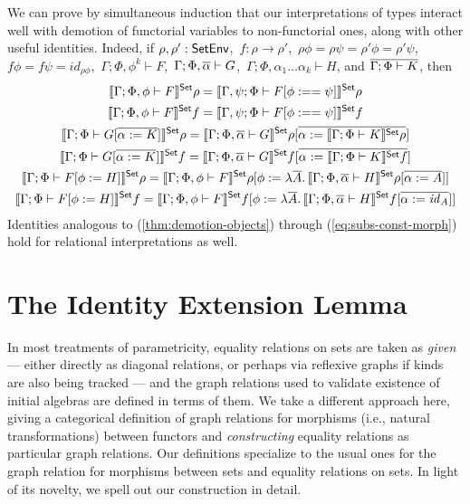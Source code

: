 \documentclass{lmcs}
\theoremstyle{plain}\newtheorem{satz}[thm]{Satz}
\renewcommand{\id}{\mathit{id}}
\begin{document}
{We can prove by simultaneous induction that our interpretations of
types interact well with demotion of functorial variables to
non-functorial ones, along with other useful identities. Indeed, if
$\rho, \rho' : \mathsf{SetEnv}$, \,$f : \rho \to \rho'$, \,$\rho \phi = \rho
\psi = \rho' \phi = \rho' \psi$, \, $f \phi = f \psi = \id_{\rho
  \phi}$,\, $\Gamma; \Phi, \phi^k \vdash F$,\,
$\Gamma;\Phi,\overline{\alpha} \vdash G$,\, $\Gamma;\Phi,\alpha_1...\alpha_k
\vdash H$, and $\overline{\Gamma;\Phi \vdash K}$, then
\begin{gather}
\label{thm:demotion-objects}
\setsem{\Gamma; \Phi, \phi \vdash F} \rho = \setsem{\Gamma, \psi; \Phi
  \vdash F[\phi :== \psi] } \rho\\
\label{thm:demotion-morphisms}
\setsem{\Gamma; \Phi, \phi \vdash F} f = \setsem{\Gamma, \psi; \Phi
  \vdash F[\phi :== \psi]} f\\
\label{eq:subs-var}
\setsem{\Gamma;\Phi \vdash G[\ol{\alpha := K}]}\rho =
\setsem{\Gamma;\Phi,\ol{\alpha} \vdash G}\rho[\ol{\alpha := 
\setsem{\Gamma;\Phi \vdash K}\rho}]\\
\label{eq:subs-var-morph}
\setsem{\Gamma;\Phi \vdash G[\ol{\alpha := K}]}f =
\setsem{\Gamma;\Phi,\ol{\alpha} \vdash G}f[\ol{\alpha :=
\setsem{\Gamma;\Phi \vdash K}f}]\\
\label{eq:subs-const}
\setsem{\Gamma; \Phi \vdash F[\phi := H]}\rho
= \setsem{\Gamma; \Phi, \phi \vdash F}\rho
[\phi := \lambda \ol{A}.\, \setsem{\Gamma;\Phi,\overline{\alpha}\vdash
    H}\rho[\overline{\alpha := A}]] \\ 
\label{eq:subs-const-morph}
\setsem{\Gamma; \Phi \vdash F[\phi := H]}f
= \setsem{\Gamma; \Phi, \phi \vdash F}f
[\phi := \lambda \ol{A}.\,\setsem{\Gamma;\Phi,\overline{\alpha}\vdash
    H}f[\overline{\alpha := \id_A}]] 
\end{gather}
Identities analogous to (\ref{thm:demotion-objects}) through
(\ref{eq:subs-const-morph}) hold for relational interpretations as well.

\section{The Identity Extension Lemma}\label{sec:iel}

In most treatments of parametricity, equality relations on sets are
taken as {\em given} --- either directly as diagonal relations, or
perhaps via reflexive graphs if kinds are also being tracked --- and
the graph relations used to validate existence of initial algebras are
defined in terms of them. We take a different approach here, giving a
categorical definition of graph relations for morphisms (i.e., natural
transformations) between functors and {\em constructing} equality
relations as particular graph relations. Our definitions specialize to
the usual ones for the graph relation for morphisms between sets and
equality relations on sets. In light of its novelty, we spell out
our construction in detail.

}
\end{document}
